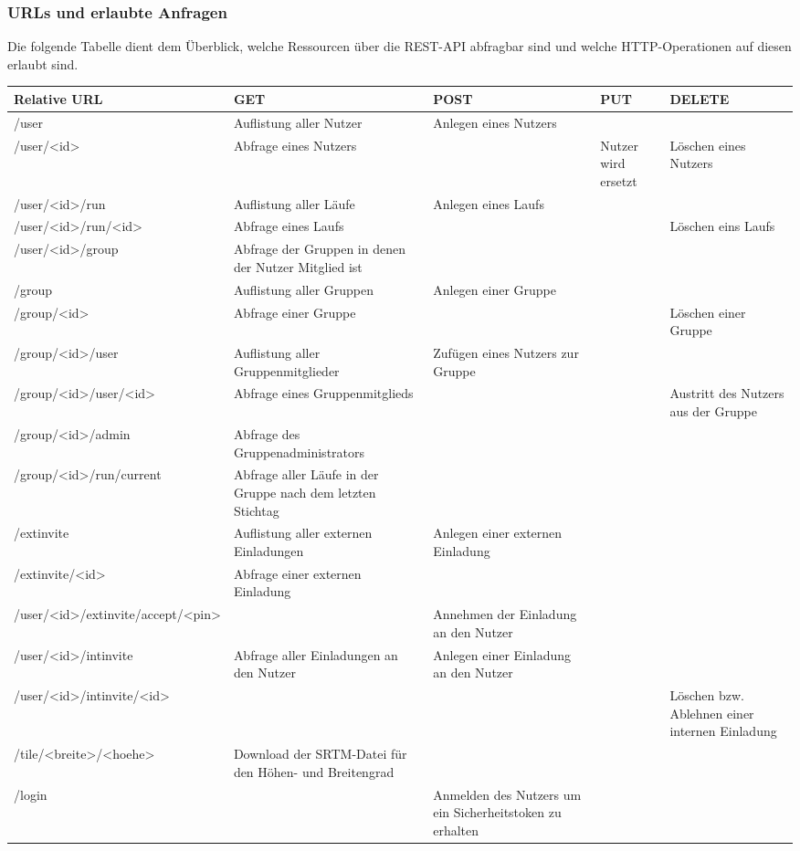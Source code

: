 \subsubsection{URLs und erlaubte Anfragen}
Die folgende Tabelle dient dem Überblick, welche Ressourcen über die REST-API abfragbar sind und welche HTTP-Operationen auf diesen erlaubt sind.
\begin{center}
\begin{longtable}{| p{4.1cm} | p{2cm} | p{2cm} | p{2cm} | p{2cm} |}
\hline
Relative URL  & GET & POST & PUT & DELETE \\ 
\hline \hline
/user & Auflistung aller Nutzer & Anlegen eines Nutzers &  & \\
\hline
/user/<id> & Abfrage eines Nutzers & & Nutzer wird ersetzt & Löschen eines Nutzers \\
\hline
/user/<id>/run & Auflistung aller Läufe & Anlegen eines Laufs & & \\
\hline
/user/<id>/\-run/<id> & Abfrage eines Laufs & & & Löschen eins Laufs \\
\hline
/user/<id>/group & Abfrage der Gruppen in denen der Nutzer Mitglied ist & & & \\
\hline
/group & Auflistung aller Gruppen & Anlegen einer Gruppe & & \\
\hline
/group/<id> & Abfrage einer Gruppe & & & Löschen einer Gruppe \\
\hline
/group/<id>/user & Auflistung aller Gruppenmitglieder & Zufügen eines Nutzers zur Gruppe & & \\
\hline
/group/<id>/\-user/<id> & Abfrage eines Gruppenmitglieds & & & Austritt des Nutzers aus der Gruppe \\
\hline
/group/<id>/admin & Abfrage des Gruppenadministrators & & & \\
\hline
/group/<id>/\-run/current & Abfrage aller Läufe in der Gruppe nach dem letzten Stichtag & & & \\
\hline
/extinvite & Auflistung aller externen Einladungen & Anlegen einer externen Einladung & & \\
\hline
/extinvite/<id> & Abfrage einer externen Einladung & & & \\
\hline
/user/<id>/\-extinvite/accept/<pin> & & Annehmen der Einladung an den Nutzer & & \\
\hline
/user/<id>/intinvite & Abfrage aller Einladungen an den Nutzer & Anlegen einer Einladung an den Nutzer & & \\
\hline
/user/<id>/\-intinvite/<id> & & & & Löschen bzw. Ablehnen einer internen Einladung \\
\hline
/tile/<breite>/<hoehe> & Download der SRTM-Datei für den Höhen- und Breitengrad & & & \\
\hline
/login & & Anmelden des Nutzers um ein Sicherheitstoken zu erhalten & & \\
\hline
\end{longtable}
\end{center}


